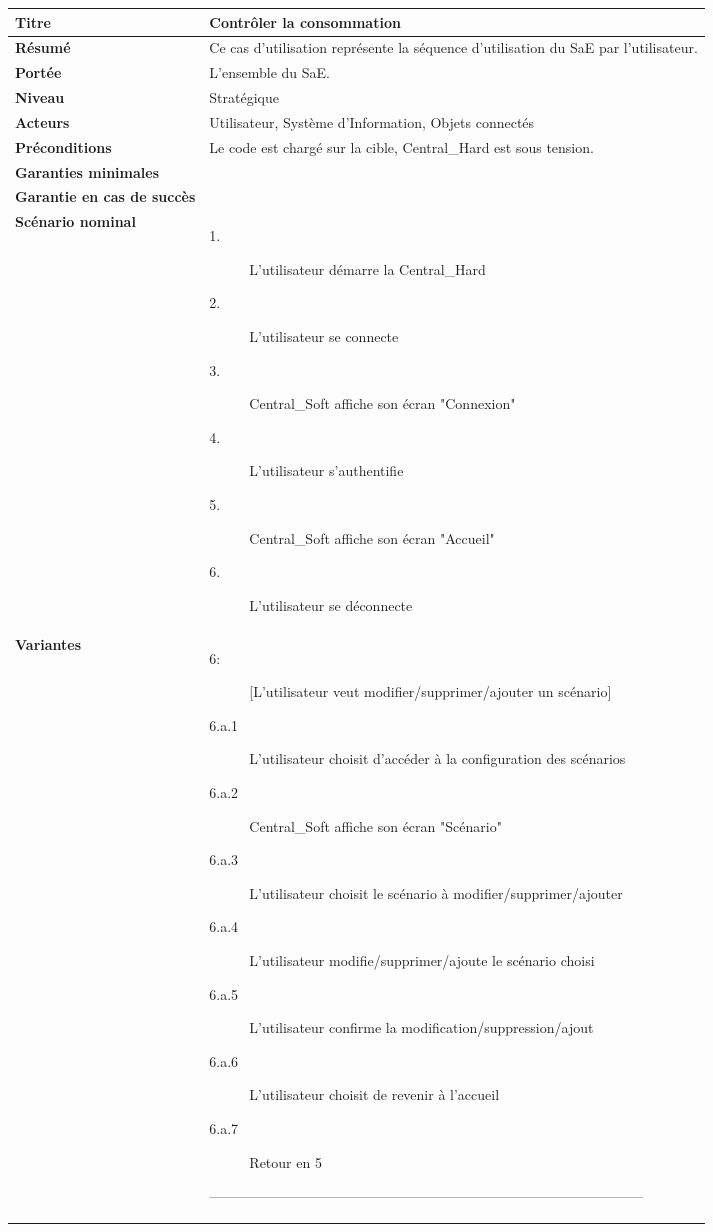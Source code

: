 \documentclass[10pt,a4paper]{report}
\renewcommand{\arraystretch}{1.2}
\begin{document}
{
\renewcommand{\arraystretch}{1.2}
\begin{longtable}{| p{5cm} | p{11cm} |}
	\hline
	\cellcolor{lightgray}\textbf{\textbf{Titre}} & \cellcolor{lightgray}\textbf{Contrôler la consommation}\tabularnewline
	\hline
	\textbf{Résumé} & Ce cas d'utilisation représente la séquence d'utilisation du SaE par l'utilisateur.\tabularnewline
	\hline
	\textbf{Portée} & L'ensemble du SaE.\tabularnewline
	\hline
	\textbf{Niveau} & Stratégique\tabularnewline
	\hline
	\textbf{Acteurs} & Utilisateur, Système d'Information, Objets connectés\tabularnewline
	\hline
	\textbf{Préconditions } & Le code est chargé sur la cible, Central\_Hard est sous tension.\tabularnewline
	\hline
	\textbf{Garanties minimales} & \tabularnewline
	\hline
	\textbf{Garantie en cas de succès} & \tabularnewline
	\hline
	\textbf{Scénario nominal} & \begin{description}
		\item[1.] L'utilisateur démarre la Central\_Hard
		\item[2.] L'utilisateur se connecte 
		\item[3.] Central\_Soft affiche son écran "Connexion"
		\item[4.] L'utilisateur s'authentifie
		\item[5.] Central\_Soft affiche son écran "Accueil"
		\item[6.] L'utilisateur se déconnecte
	\end{description} \tabularnewline
	\hline 
	\textbf{Variantes} &\begin{description}
		\item[6:] [L'utilisateur veut modifier/supprimer/ajouter un scénario]
		\item[6.a.1] L'utilisateur choisit d'accéder à la configuration des scénarios
		\item[6.a.2] Central\_Soft affiche son écran "Scénario"
		\item[6.a.3] L'utilisateur choisit le scénario à modifier/supprimer/ajouter
		\item[6.a.4] L'utilisateur modifie/supprimer/ajoute le scénario choisi
		\item[6.a.5] L'utilisateur confirme la modification/suppression/ajout
		\item[6.a.6] L'utilisateur choisit de revenir à l'accueil
		\item[6.a.7] Retour en 5
	\end{description} 
	---------------------------------------------------------------------------------------------
	\begin{description}

\end{description}
\end{longtable}}
\end{document}
